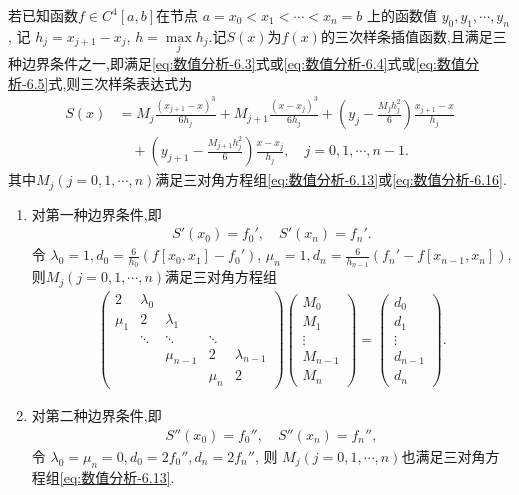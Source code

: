 \documentclass[../../main.tex]{subfiles}
\begin{document}
\begin{theorem}
若已知函数$f\in C^4[a,b]$在节点 $a = x_0 < x_1 < \cdots < x_n = b$ 上的函数值 $y_0, y_1, \cdots, y_n$, 记 $h_j = x_{j + 1} - x_j$, $h = \max\limits_j h_j$.记$S(x)$为$f(x)$的三次样条插值函数,且满足三种边界条件之一,即满足\eqref{eq:数值分析-6.3}式或\eqref{eq:数值分析-6.4}式或\eqref{eq:数值分析-6.5}式,则三次样条表达式为
\begin{align}
S(x) &= M_j \frac{(x_{j + 1} - x)^3}{6 h_j} + M_{j + 1} \frac{(x - x_j)^3}{6 h_j} + \left( y_j - \frac{M_j h_j^2}{6} \right) \frac{x_{j + 1} - x}{h_j} \nonumber \\
&\quad + \left( y_{j + 1} - \frac{M_{j + 1} h_j^2}{6} \right) \frac{x - x_j}{h_j}, \quad j = 0, 1, \cdots, n - 1. \label{eq:数值分析-6..8}
\end{align}
其中$M_j(j=0,1,\cdots,n)$满足三对角方程组\eqref{eq:数值分析-6.13}或\eqref{eq:数值分析-6.16}.
\begin{enumerate}[(1)]
\item 对第一种边界条件,即
\begin{align*}
S'(x_0) = f_0', \quad S'(x_n) = f_n'.
\end{align*}
令 $\lambda_0 = 1, d_0 = \frac{6}{h_0} (f[x_0, x_1] - f_0')$, $\mu_n = 1, d_n = \frac{6}{h_{n - 1}} (f_n' - f[x_{n - 1}, x_n])$,则$M_j(j=0,1,\cdots,n)$满足三对角方程组
\begin{align}
\begin{pmatrix}
2 & \lambda_0 \\
\mu_1 & 2 & \lambda_1 \\
& \ddots & \ddots & \ddots \\
& & \mu_{n - 1} & 2 & \lambda_{n - 1} \\
& & & \mu_n & 2
\end{pmatrix}
\begin{pmatrix}
M_0 \\
M_1 \\
\vdots \\
M_{n - 1} \\
M_n
\end{pmatrix}
=
\begin{pmatrix}
d_0 \\
d_1 \\
\vdots \\
d_{n - 1} \\
d_n
\end{pmatrix}. \label{eq:数值分析-6.13}
\end{align}

\item 对第二种边界条件,即
\begin{align*}
S''(x_0) = f_0'', \quad S''(x_n) = f_n'', 
\end{align*}
令 $\lambda_0 = \mu_n = 0, d_0 = 2 f_0'', d_n = 2 f_n''$, 则
$M_j(j=0,1,\cdots,n)$也满足三对角方程组\eqref{eq:数值分析-6.13}. 


\end{enumerate}
\end{theorem}
\end{document}
